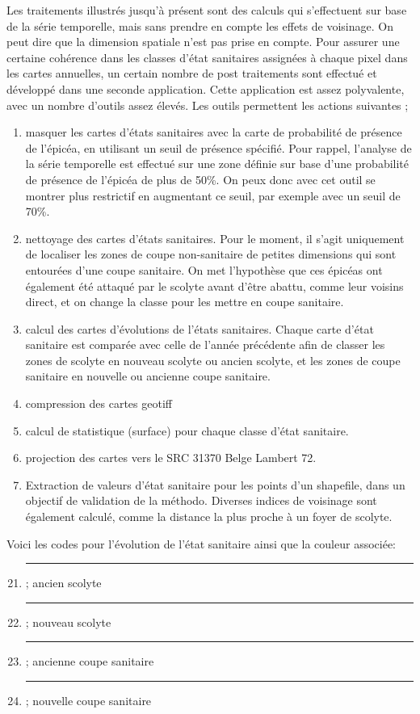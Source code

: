 \documentclass[a4paper, 12pt]{article} %
\newcommand\crule[3][black]{\textcolor{#1}{\rule{#2}{#3}}}
\begin{document}
Les traitements illustrés jusqu'à présent sont des calculs qui s'effectuent sur base de la série temporelle, mais sans prendre en compte les effets de voisinage. On peut dire que la dimension spatiale n'est pas prise en compte. Pour assurer une certaine cohérence dans les classes d'état sanitaires assignées à chaque pixel dans les cartes annuelles, un certain nombre de post traitements sont effectué et développé dans une seconde application. Cette application est assez polyvalente, avec un nombre d'outils assez élevés. Les outils permettent les actions suivantes ;
\begin{enumerate}\addtocounter{enumi}{-1}
	
	\item masquer les cartes d'états sanitaires avec la carte de probabilité de présence de l'épicéa, en utilisant un seuil de présence spécifié. Pour rappel, l'analyse de la série temporelle est effectué sur une zone définie sur base d'une probabilité de présence de l'épicéa de plus de 50\%. On peux donc avec cet outil se montrer plus restrictif en augmentant ce seuil, par exemple avec un seuil de 70\%.
	\item nettoyage des cartes d'états sanitaires. Pour le moment, il s'agit uniquement de localiser les zones de coupe non-sanitaire de petites dimensions qui sont entourées d'une coupe sanitaire. On met l'hypothèse que ces épicéas ont également été attaqué par le scolyte avant d'être abattu, comme leur voisins direct, et on change la classe pour les mettre en coupe sanitaire.
	\item calcul des cartes d'évolutions de l'états sanitaires. Chaque carte d'état sanitaire est comparée avec celle de l'année précédente afin de classer les zones de scolyte en nouveau scolyte ou ancien scolyte, et les zones de coupe sanitaire en nouvelle ou ancienne coupe sanitaire.
	\item  compression des cartes geotiff
	\item calcul de statistique (surface) pour chaque classe d'état sanitaire.
	\item projection des cartes vers le SRC 31370 Belge Lambert 72.
	\item Extraction de valeurs d'état sanitaire pour les points d'un shapefile, dans un objectif de validation de la méthodo. Diverses indices de voisinage sont également calculé, comme la distance la plus proche à un foyer de scolyte.
\end{enumerate}

Voici les codes pour l'évolution de l'état sanitaire ainsi que la couleur associée:
\begin{enumerate}\setcounter{enumi}{20}
	\item \crule[cl21]{1cm}{1cm} ; ancien scolyte
	\item \crule[cl22]{1cm}{1cm} ; nouveau scolyte
	\setcounter{enumi}{40}
	\item \crule[cl41]{1cm}{1cm} ; ancienne coupe sanitaire
	\item \crule[cl42]{1cm}{1cm} ; nouvelle coupe sanitaire
\end{enumerate} 
\end{document}
